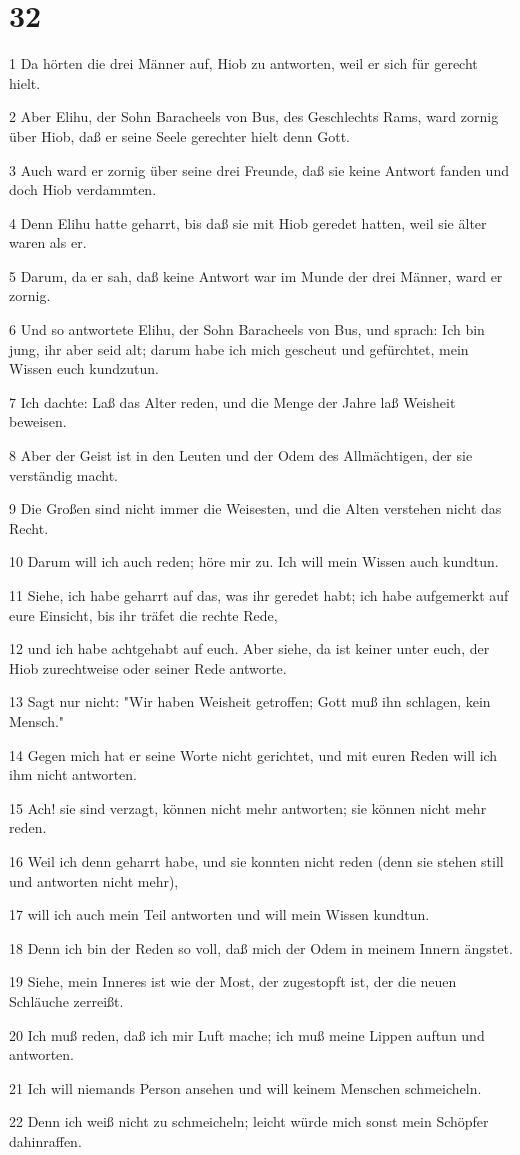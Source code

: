 \chapter{32}

\par 1 Da hörten die drei Männer auf, Hiob zu antworten, weil er sich für gerecht hielt.
\par 2 Aber Elihu, der Sohn Baracheels von Bus, des Geschlechts Rams, ward zornig über Hiob, daß er seine Seele gerechter hielt denn Gott.
\par 3 Auch ward er zornig über seine drei Freunde, daß sie keine Antwort fanden und doch Hiob verdammten.
\par 4 Denn Elihu hatte geharrt, bis daß sie mit Hiob geredet hatten, weil sie älter waren als er.
\par 5 Darum, da er sah, daß keine Antwort war im Munde der drei Männer, ward er zornig.
\par 6 Und so antwortete Elihu, der Sohn Baracheels von Bus, und sprach: Ich bin jung, ihr aber seid alt; darum habe ich mich gescheut und gefürchtet, mein Wissen euch kundzutun.
\par 7 Ich dachte: Laß das Alter reden, und die Menge der Jahre laß Weisheit beweisen.
\par 8 Aber der Geist ist in den Leuten und der Odem des Allmächtigen, der sie verständig macht.
\par 9 Die Großen sind nicht immer die Weisesten, und die Alten verstehen nicht das Recht.
\par 10 Darum will ich auch reden; höre mir zu. Ich will mein Wissen auch kundtun.
\par 11 Siehe, ich habe geharrt auf das, was ihr geredet habt; ich habe aufgemerkt auf eure Einsicht, bis ihr träfet die rechte Rede,
\par 12 und ich habe achtgehabt auf euch. Aber siehe, da ist keiner unter euch, der Hiob zurechtweise oder seiner Rede antworte.
\par 13 Sagt nur nicht: "Wir haben Weisheit getroffen; Gott muß ihn schlagen, kein Mensch."
\par 14 Gegen mich hat er seine Worte nicht gerichtet, und mit euren Reden will ich ihm nicht antworten.
\par 15 Ach! sie sind verzagt, können nicht mehr antworten; sie können nicht mehr reden.
\par 16 Weil ich denn geharrt habe, und sie konnten nicht reden (denn sie stehen still und antworten nicht mehr),
\par 17 will ich auch mein Teil antworten und will mein Wissen kundtun.
\par 18 Denn ich bin der Reden so voll, daß mich der Odem in meinem Innern ängstet.
\par 19 Siehe, mein Inneres ist wie der Most, der zugestopft ist, der die neuen Schläuche zerreißt.
\par 20 Ich muß reden, daß ich mir Luft mache; ich muß meine Lippen auftun und antworten.
\par 21 Ich will niemands Person ansehen und will keinem Menschen schmeicheln.
\par 22 Denn ich weiß nicht zu schmeicheln; leicht würde mich sonst mein Schöpfer dahinraffen.

